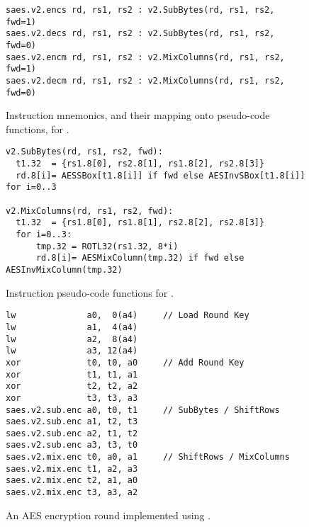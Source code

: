 
\vspace*{\fill}

\begin{figure}[!h]
\begin{lstlisting}[language=pseudo,style=block]
saes.v2.encs rd, rs1, rs2 : v2.SubBytes(rd, rs1, rs2, fwd=1)
saes.v2.decs rd, rs1, rs2 : v2.SubBytes(rd, rs1, rs2, fwd=0)
saes.v2.encm rd, rs1, rs2 : v2.MixColumns(rd, rs1, rs2, fwd=1)
saes.v2.decm rd, rs1, rs2 : v2.MixColumns(rd, rs1, rs2, fwd=0)
\end{lstlisting}
\caption{
  Instruction mnemonics, and their mapping onto pseudo-code functions, for .
}
\label{fig:v2:mnemonics}
\end{figure}

\begin{figure}[!h]
\begin{lstlisting}[language=pseudo,style=block]
v2.SubBytes(rd, rs1, rs2, fwd):
  t1.32  = {rs1.8[0], rs2.8[1], rs1.8[2], rs2.8[3]}
  rd.8[i]= AESSBox[t1.8[i]] if fwd else AESInvSBox[t1.8[i]] for i=0..3

v2.MixColumns(rd, rs1, rs2, fwd):
  t1.32  = {rs1.8[0], rs1.8[1], rs2.8[2], rs2.8[3]}
  for i=0..3:
      tmp.32 = ROTL32(rs1.32, 8*i)
      rd.8[i]= AESMixColumn(tmp.32) if fwd else AESInvMixColumn(tmp.32)
\end{lstlisting}
\caption{
  Instruction pseudo-code functions for .
}
\label{fig:v2:pseudo}
\end{figure}

\begin{figure}[!h]
\begin{lstlisting}[language=pseudo,style=block]
lw              a0,  0(a4)     // Load Round Key
lw              a1,  4(a4)
lw              a2,  8(a4)
lw              a3, 12(a4)
xor             t0, t0, a0     // Add Round Key
xor             t1, t1, a1
xor             t2, t2, a2
xor             t3, t3, a3
saes.v2.sub.enc a0, t0, t1     // SubBytes / ShiftRows
saes.v2.sub.enc a1, t2, t3
saes.v2.sub.enc a2, t1, t2
saes.v2.sub.enc a3, t3, t0
saes.v2.mix.enc t0, a0, a1     // ShiftRows / MixColumns
saes.v2.mix.enc t1, a2, a3
saes.v2.mix.enc t2, a1, a0
saes.v2.mix.enc t3, a3, a2
\end{lstlisting}
\caption{
  An AES encryption round implemented using .
}
\label{fig:v2:round}
\end{figure}

\vspace*{\fill}



